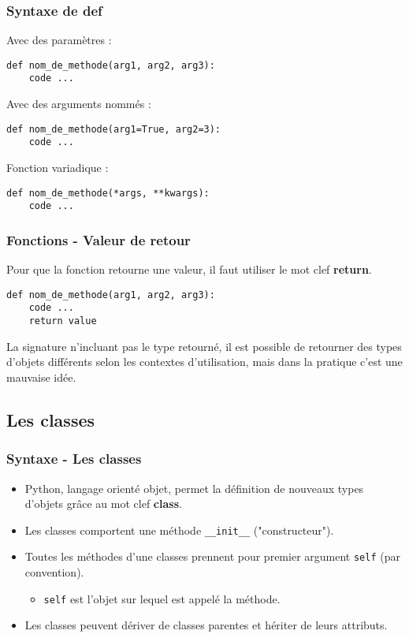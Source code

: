 \begin{frame}[fragile]
  \frametitle{Syntaxe de def}
Avec des paramètres :
  \begin{lstlisting}
def nom_de_methode(arg1, arg2, arg3):
    code ...
  \end{lstlisting}
Avec des arguments nommés :
  \begin{lstlisting}
def nom_de_methode(arg1=True, arg2=3):
    code ...
  \end{lstlisting}
Fonction variadique :
  \begin{lstlisting}
def nom_de_methode(*args, **kwargs):
    code ...
  \end{lstlisting}
\end{frame}

\begin{frame}[fragile]
  \frametitle{Fonctions - Valeur de retour}
Pour que la fonction retourne une valeur, il faut utiliser le mot clef {\bf return}.
  \begin{lstlisting}
def nom_de_methode(arg1, arg2, arg3):
    code ...
    return value
  \end{lstlisting}

La signature n'incluant pas le type retourné, il est possible de retourner des types d'objets différents selon les contextes d'utilisation, mais dans la pratique c'est une mauvaise idée.
\end{frame}

\subsection{Les classes}
\begin{frame}[fragile]
  \frametitle{Syntaxe - Les classes}
  \begin{itemize}
    \item<1-> Python, langage orienté objet, permet la définition de nouveaux types d'objets grâce au mot clef {\bf class}.
    \item<2-> Les classes comportent une méthode \verb=__init__= ("constructeur").
    \item<3-> Toutes les méthodes d'une classes prennent pour premier argument \verb=self= (par convention).
    \begin{itemize}
      \item<3-> \verb=self= est l'objet sur lequel est appelé la méthode.
    \end{itemize}
    \item<4-> Les classes peuvent dériver de classes parentes et hériter de leurs attributs.
  \end{itemize}
\end{frame}

